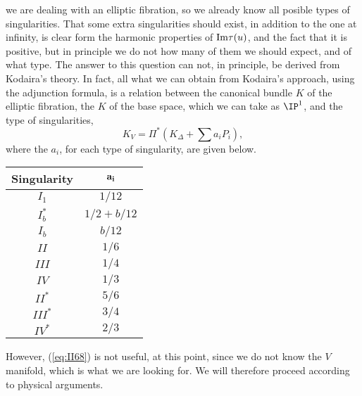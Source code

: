 we are dealing with an elliptic fibration, so we already know all 
posible types of singularities. That some extra singularities 
should exist, in addition to the one at infinity, is clear form the 
harmonic properties of $\hbox {Im} \tau(u)$, and the fact that it is 
positive, but in principle we do not how many of them we should 
expect, and of what type. The answer to this question can not, in principle, 
be derived from Kodaira's theory. In fact, all what we can obtain 
from Kodaira's approach, using the adjunction formula, is a relation 
between the canonical bundle $K$ of the elliptic fibration, the 
$K$ of the base space, which we can take as $\IP^1$, and the type 
of singularities,
\begin{equation}
K_V = \Pi^* (K_{\Delta} + \sum a_i P_i),
\label{eq:II68}
\end{equation}
where the $a_i$, for each type of singularity, are given below.

\begin{center}

\begin{tabular}{|c|c|}     \hline\hline
	 {\bf Singularity}      & ${\bf a_i}$     \\ \hline
	 $I_1$                  & $1/12$   \\
	 $I_b^*$                & $1/2+b/12$   \\
	 $I_b$                  & $b/12$   \\
	 $II$                   & $1/6$   \\
	 $III$                  & $1/4$   \\
	 $IV$                   & $1/3$   \\ 
	 $II^*$                 & $5/6$   \\         
	 $III^*$                & $3/4$   \\
	 $IV^*$                 & $2/3$   \\ \hline\hline

\end{tabular}
\label{tab:5}
\end{center}

However, (\ref{eq:II68}) is not useful, at this point, since we do not 
know the $V$ manifold, which is what we are looking for. 
We will therefore proceed according to physical arguments.
  
